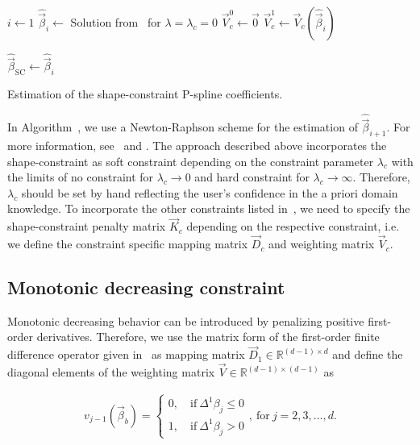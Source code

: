\begin{algorithm}[H]
	\SetAlgoLined
	$ i \gets 1$\;
	$\hat{\vec{\beta}}_{i} \gets$ Solution from~ for $\lambda = \lambda_c = 0$\;
	$\vec{V}^0_c \gets \vec{0}$\;
	$\vec{V}^1_c \gets \vec{V}_c(\hat{\vec{\beta}}_{i})$\;

	$\hat{\vec{\beta}}_{\mathrm{SC}} \gets \hat{\vec{\beta}}_{i}$\;
	\caption{Estimation of the shape-constraint P-spline coefficients.}
	\label{alg:scp}
\end{algorithm}
%
In Algorithm~, we use a Newton-Raphson scheme for the estimation of $\hat{\vec{\beta}}_{i+1}$. For more information, see~ and \cite{bollaerts2006simple}. The approach described above incorporates the shape-constraint as soft constraint depending on the constraint parameter $\lambda_c$ with the limits of no constraint for $\lambda_c \rightarrow 0$ and hard constraint for $\lambda_c \rightarrow \infty$. Therefore, $\lambda_c$ should be set by hand reflecting the user's confidence in  the a priori domain knowledge. To incorporate the other constraints listed in~, we need to specify the shape-constraint  penalty matrix $\vec{K}_c$ depending on the respective constraint, i.e. we define the constraint specific mapping matrix $\vec{D}_c$ and weighting matrix $\vec{V}_c$. 

\subsection{Monotonic decreasing constraint} \label{subsec:MDC}

Monotonic decreasing behavior can be introduced by penalizing positive first-order derivatives. Therefore, we use the matrix form of the first-order finite difference operator given in~ as mapping matrix $\vec{D}_1 \in \mathbb{R}^{(d-1) \times d}$ and define the diagonal elements of the weighting matrix $\vec{V} \in \mathbb{R}^{(d-1) \times (d-1)}$ as

\begin{align} \label{eq:weighting-matrix-dec-diagonal}
	v_{j-1}(\vec{\beta}_b) = \begin{cases}
		0, \quad \text{if} \ \Delta^1\beta_j \le 0 \\ 
		1, \quad \text{if} \ \Delta^1\beta_j > 0
	\end{cases},	\ \text{for} \ j=2,3, \dots, d.
\end{align}


